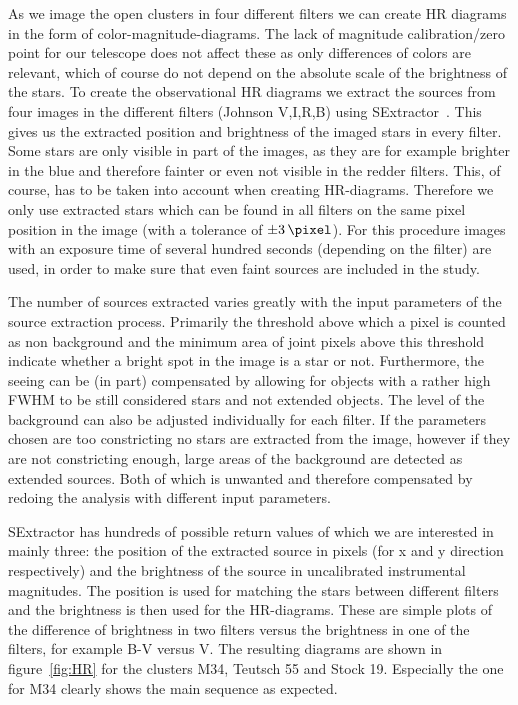 \documentclass{article}
\begin{document}
As we image the open clusters in four different filters we can create HR diagrams in the form of color-magnitude-diagrams. The lack of magnitude calibration/zero point for our telescope does not affect these as only differences of colors are relevant, which of course do not depend on the absolute scale of the brightness of the stars. To create the observational HR diagrams we extract the sources from four images in the different filters (Johnson V,I,R,B) using SExtractor~\parencite{SExtractor}. This gives us the extracted position and brightness of the imaged stars in every filter. Some stars are only visible in part of the images, as they are for example brighter in the blue and therefore fainter or even not visible in the redder filters. This, of course, has to be taken into account when creating HR-diagrams. Therefore we only use extracted stars which can be found in all filters on the same pixel position in the image (with a tolerance of $\SI{\pm 3}{\pixel}$). For this procedure images with an exposure time of several hundred seconds (depending on the filter) are used, in order to make sure that even faint sources are included in the study.

The number of sources extracted varies greatly with the input parameters of the source extraction process. Primarily the threshold above which a pixel is counted as non background and the minimum area of joint pixels above this threshold indicate whether a bright spot in the image is a star or not. Furthermore, the seeing can be (in part) compensated by allowing for objects with a rather high FWHM to be still considered stars and not extended objects. The level of the background can also be adjusted individually for each filter. If the parameters chosen are too constricting no stars are extracted from the image, however if they are not constricting enough, large areas of the background are detected as extended sources. Both of which is unwanted and therefore compensated by redoing the analysis with different input parameters. 

SExtractor has hundreds of possible return values of which we are interested in mainly three: the position of the extracted source in pixels (for x and y direction respectively) and the brightness of the source in uncalibrated instrumental magnitudes. The position is used for matching the stars between different filters and the brightness is then used for the HR-diagrams. These are simple plots of the difference of brightness in two filters versus the brightness in one of the filters, for example B-V versus V. The resulting diagrams are shown in figure~\ref{fig:HR} for the clusters M34, Teutsch 55 and Stock 19. Especially the one for M34 clearly shows the main sequence as expected. 
\end{document}
